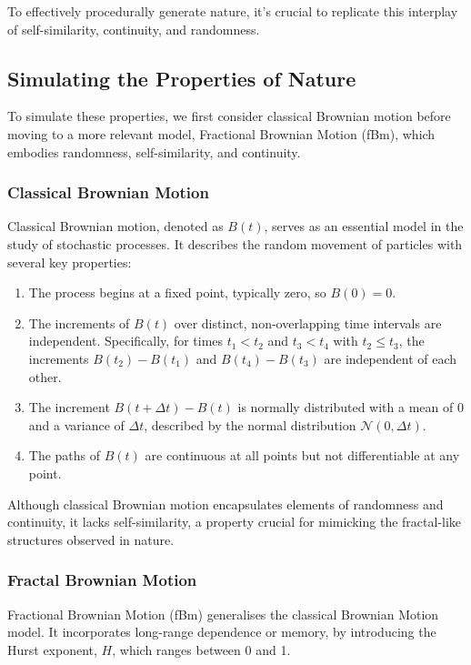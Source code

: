 To effectively procedurally generate nature, it's crucial to replicate this interplay of self-similarity, continuity, and randomness.

\subsection{Simulating the Properties of Nature}

To simulate these properties, we first consider classical Brownian motion before moving to a more relevant model, Fractional Brownian Motion (fBm), which embodies randomness, self-similarity, and continuity.

\subsubsection{Classical Brownian Motion}

Classical Brownian motion, denoted as $B(t)$, serves as an essential model in the study of stochastic processes. It describes the random movement of particles with several key properties:

\begin{enumerate}
    \item The process begins at a fixed point, typically zero, so $B(0) = 0$.
    \item  The increments of $B(t)$ over distinct, non-overlapping time intervals are independent. Specifically, for times $t_1 < t_2$ and $t_3 < t_4$ with $t_2 \leq t_3$, the increments $B(t_2) - B(t_1)$ and $B(t_4) - B(t_3)$ are independent of each other.
    \item The increment $B(t + \Delta t) - B(t)$ is normally distributed with a mean of 0 and a variance of $\Delta t$, described by the normal distribution $\mathcal{N}(0, \Delta t)$.
    \item The paths of $B(t)$ are continuous at all points but not differentiable at any point.
\end{enumerate}

Although classical Brownian motion encapsulates elements of randomness and continuity, it lacks self-similarity, a property crucial for mimicking the fractal-like structures observed in nature. 

\subsubsection{Fractal Brownian Motion}

Fractional Brownian Motion (fBm) generalises the classical Brownian Motion model. It incorporates long-range dependence or memory,  by introducing the Hurst exponent, $H$, which ranges between 0 and 1. 

